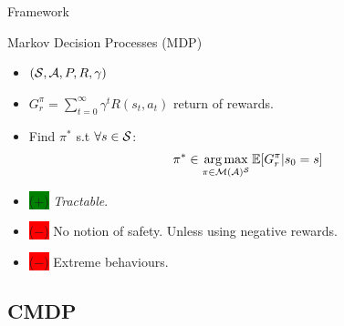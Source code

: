 \documentclass{beamer}
\newcommand{\cplus}{\colorbox{green}{($+$)} }
\newcommand{\cmoins}{\colorbox{red}{($-$)} }
\begin{document}
    \begin{frame}{Framework}
        \begin{block}{Markov Decision Processes (MDP)}
            \begin{itemize}
                \item $(\mathcal{S}, \mathcal{A}, P, R, \gamma)$
                \item $G_r^\pi = \sum_{t=0}^\infty \gamma^t R(s_t, a_t)$ return of rewards.
                \item Find $\pi^*$ s.t $\forall s\in\mathcal{S}$:
                \begin{equation}
                    \label{eq:mdp}
                    \begin{array}{lcr}
                        \displaystyle \pi^* \in \operatorname*{arg\,max}_{\pi\in\mathcal{M}(\mathcal{A})^{\mathcal{S}}} \operatorname*{\mathbb{E}}[G_r^\pi | s_0=s]
                    \end{array}
                \end{equation}

            \end{itemize}
        \end{block}


        \begin{block}{}
            \begin{itemize}
                \item \cplus \textit{Tractable}.
                \item \cmoins No notion of safety. Unless using negative rewards.
                \item \cmoins Extreme behaviours.
            \end{itemize}
        \end{block}

    \end{frame}

    \subsection{CMDP}
\end{document}
